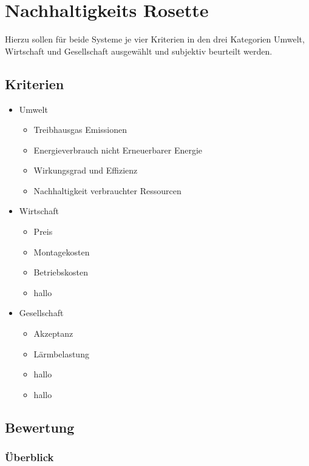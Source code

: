 \chapter{Nachhaltigkeits Rosette}
\label{chap:rosette}

Hierzu sollen für beide Systeme je vier Kriterien in den drei Kategorien
Umwelt, Wirtschaft und Gesellschaft ausgewählt und subjektiv beurteilt werden.

\section{Kriterien}

\begin{itemize}
  \item Umwelt
    \begin{itemize}
      \item Treibhausgas Emissionen
      \item Energieverbrauch nicht Erneuerbarer Energie
      \item Wirkungsgrad und Effizienz
      \item Nachhaltigkeit verbrauchter Ressourcen
    \end{itemize}
 \item Wirtschaft
    \begin{itemize}
      \item Preis
      \item Montagekosten
      \item Betriebskosten
      \item hallo
    \end{itemize}
 \item Gesellschaft
    \begin{itemize}
      \item Akzeptanz
      \item Lärmbelastung
      \item hallo
      \item hallo
    \end{itemize}
\end{itemize}

\section{Bewertung}
\subsection{Überblick}

